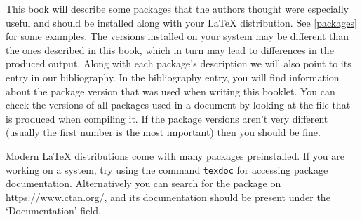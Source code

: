 This book will describe some packages that the authors thought were especially
useful and should be installed along with your \LaTeX{} distribution. See
\autoref{packages} for some examples. The versions installed on your system may
be different than
the ones described in this book, which in turn may lead to differences in the
produced output. Along with each package's description we will also point
to its entry in our bibliography. In the bibliography entry, you will find
information about the package version that was used when writing this booklet.
You can check the versions of all packages used in a document by looking
at the  file that is produced when compiling it. If the
package versions aren't very different (usually the first number is the most
important) then you should be fine.

Modern \LaTeX{} distributions come with many packages
preinstalled. If you are working on a \Unix{} system, try using the command
\texttt{texdoc} for accessing package documentation. Alternatively you can
search for the package on \url{https://www.ctan.org/}, and its documentation
should be present under the \enquote*{Documentation} field.

